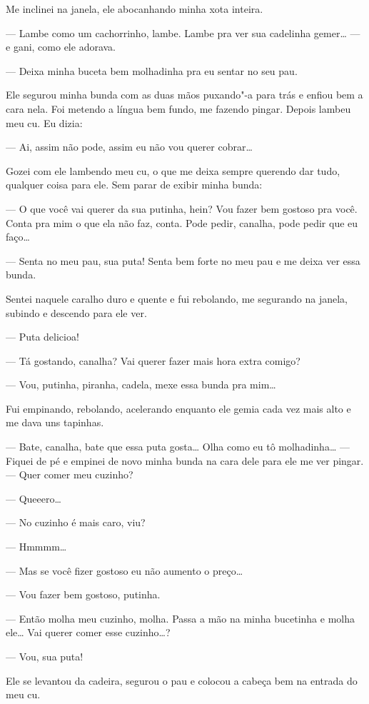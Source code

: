 Me inclinei na janela, ele abocanhando minha xota inteira.

--- Lambe como um cachorrinho, lambe. Lambe pra ver sua cadelinha
gemer… --- e gani, como ele adorava.

--- Deixa minha buceta bem molhadinha pra eu sentar no seu pau.

Ele segurou minha bunda com as duas mãos puxando"-a para trás e enfiou
bem a cara nela. Foi metendo a língua bem fundo, me fazendo pingar.
Depois lambeu meu cu. Eu dizia:

--- Ai, assim não pode, assim eu não vou querer cobrar…

Gozei com ele lambendo meu cu, o que me deixa sempre querendo dar tudo,
qualquer coisa para ele. Sem parar de exibir minha bunda:

--- O que você vai querer da sua putinha, hein? Vou fazer bem gostoso
pra você. Conta pra mim o que ela não faz, conta. Pode pedir, canalha,
pode pedir que eu faço…

--- Senta no meu pau, sua puta! Senta bem forte no meu pau e me deixa
ver essa bunda.

Sentei naquele caralho duro e quente e fui rebolando, me segurando na
janela, subindo e descendo para ele ver.

--- Puta delicioa!

--- Tá gostando, canalha? Vai querer fazer mais hora extra comigo?

--- Vou, putinha, piranha, cadela, mexe essa bunda pra mim…

Fui empinando, rebolando, acelerando enquanto ele gemia cada vez mais
alto e me dava uns tapinhas.

--- Bate, canalha, bate que essa puta gosta… Olha como eu tô
molhadinha… --- Fiquei de pé e empinei de novo minha bunda na
cara dele para ele me ver pingar. --- Quer comer meu cuzinho?

--- Queeero…

--- No cuzinho é mais caro, viu?

--- Hmmmm…

--- Mas se você fizer gostoso eu não aumento o preço…

--- Vou fazer bem gostoso, putinha.

--- Então molha meu cuzinho, molha. Passa a mão na minha bucetinha e
molha ele… Vai querer comer esse cuzinho…?

--- Vou, sua puta!

Ele se levantou da cadeira, segurou o pau e colocou a cabeça bem na
entrada do meu cu.

